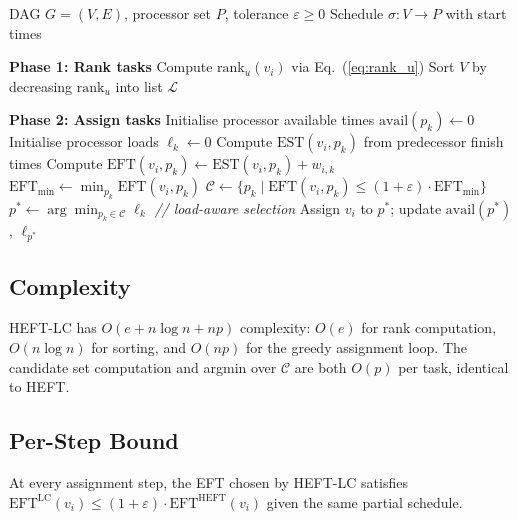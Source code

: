 \documentclass[conference]{IEEEtran}
\begin{document}
\begin{algorithm}
\caption{HEFT-LC Scheduling Algorithm}
\label{alg:heft_lc}
\begin{algorithmic}[1]
\REQUIRE DAG $G=(V,E)$, processor set $P$, tolerance $\varepsilon \geq 0$
\ENSURE Schedule $\sigma: V \to P$ with start times

\STATE \textbf{Phase 1: Rank tasks}
  \STATE Compute $\text{rank}_u(v_i)$ via Eq.~(\ref{eq:rank_u})
\ENDFOR
\STATE Sort $V$ by decreasing $\text{rank}_u$ into list $\mathcal{L}$

\STATE \textbf{Phase 2: Assign tasks}
\STATE Initialise processor available times $\text{avail}(p_k) \gets 0$
\STATE Initialise processor loads $\ell_k \gets 0$
    \STATE Compute $\text{EST}(v_i, p_k)$ from predecessor finish times
    \STATE Compute $\text{EFT}(v_i, p_k) \gets \text{EST}(v_i, p_k) + w_{i,k}$
  \ENDFOR
  \STATE $\text{EFT}_{\min} \gets \min_{p_k} \text{EFT}(v_i, p_k)$
  \STATE $\mathcal{C} \gets \{p_k \mid \text{EFT}(v_i, p_k) \leq (1 + \varepsilon) \cdot \text{EFT}_{\min}\}$
  \STATE $p^* \gets \arg\min_{p_k \in \mathcal{C}} \ell_k$ \hfill \textit{// load-aware selection}
  \STATE Assign $v_i$ to $p^*$; update $\text{avail}(p^*)$, $\ell_{p^*}$
\ENDFOR
\end{algorithmic}
\end{algorithm}

\subsection{Complexity}

HEFT-LC has $O(e + n \log n + np)$ complexity: $O(e)$ for rank
computation, $O(n \log n)$ for sorting, and $O(np)$ for the greedy
assignment loop. The candidate set computation and argmin over
$\mathcal{C}$ are both $O(p)$ per task, identical to HEFT.

\subsection{Per-Step Bound}

\begin{proposition}
At every assignment step, the EFT chosen by HEFT-LC satisfies
$\text{EFT}^{\text{LC}}(v_i) \leq (1+\varepsilon) \cdot
\text{EFT}^{\text{HEFT}}(v_i)$ given the same partial schedule.
\end{proposition}
\end{document}
